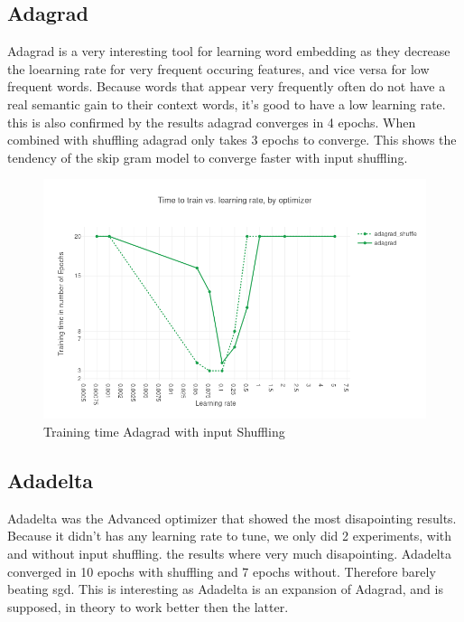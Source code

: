 \subsection{Adagrad}
Adagrad is a very interesting tool for learning word embedding as they decrease the loearning rate for very frequent occuring features, and vice versa for low frequent words. Because words that appear very frequently often do not have a real semantic gain to their context words, it's good to have a low learning rate. this is also confirmed by the results adagrad converges in 4 epochs. When combined with shuffling adagrad only takes 3 epochs to converge. This shows the tendency of the skip gram model to converge faster with input shuffling.
\begin{figure}[h]
    \centering
			\includegraphics[scale=0.45]{images/results_adagrad_shuffle} 
    \caption{Training time Adagrad with input Shuffling}
    \label{fig:results_adagrad_shuffle}
\end{figure}
\subsection{Adadelta}
Adadelta was the Advanced optimizer that showed the most disapointing results. Because it didn't has any learning rate to tune, we only did 2 experiments, with and without input shuffling. the results where very much disapointing. Adadelta converged in 10 epochs with shuffling and 7 epochs without. Therefore barely beating sgd. This is interesting as Adadelta is an expansion of Adagrad, and is supposed, in theory to work better then the latter. 
